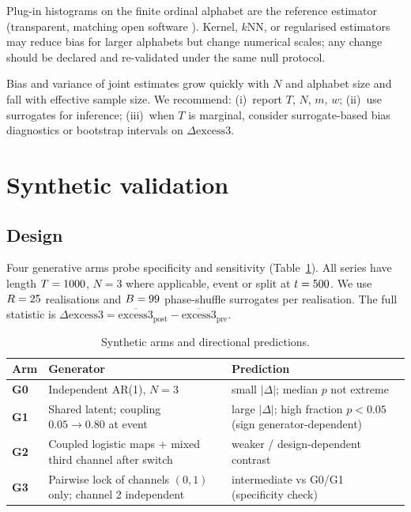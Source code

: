 \documentclass[11pt,a4paper]{article}
\begin{document}
Plug-in histograms on the finite ordinal alphabet are the reference
estimator (transparent, matching open software
\citep{Padilla2026software}). Kernel, $k$NN, or regularised estimators may
reduce bias for larger alphabets but change numerical scales; any change
should be declared and re-validated under the same null protocol.

Bias and variance of joint estimates grow quickly with $N$ and alphabet
size and fall with effective sample size. We recommend: (i)~report $T$,
$N$, $m$, $w$; (ii)~use surrogates for inference; (iii)~when $T$ is
marginal, consider surrogate-based bias diagnostics or bootstrap
intervals on $\Delta\mathrm{excess3}$.

\section{Synthetic validation}
\label{sec:validation}

\subsection{Design}
\label{sec:val_design}

Four generative arms probe specificity and sensitivity
(Table~\ref{tab:arms}). All series have length $T=1000$, $N=3$ where
applicable, event or split at $t=500$. We use $R=25$ realisations
and $B=99$ phase-shuffle surrogates per realisation. The full statistic
is $\Delta\mathrm{excess3}=\overline{\mathrm{excess3}}_{\mathrm{post}}
-\overline{\mathrm{excess3}}_{\mathrm{pre}}$.

\begin{table}[H]
\centering
\caption{Synthetic arms and directional predictions.}
\label{tab:arms}
\begin{tabular}{@{}p{1.2cm}p{5.2cm}p{5.5cm}@{}}
\toprule
Arm & Generator & Prediction \\
\midrule
\textbf{G0} & Independent AR(1), $N=3$ & small $|\Delta|$; median $p$ not extreme \\
\textbf{G1} & Shared latent; coupling $0.05\to 0.80$ at event & large $|\Delta|$; high fraction $p<0.05$ (sign generator-dependent) \\
\textbf{G2} & Coupled logistic maps + mixed third channel after switch & weaker / design-dependent contrast \\
\textbf{G3} & Pairwise lock of channels $(0,1)$ only; channel 2 independent & intermediate vs G0/G1 (specificity check) \\
\bottomrule
\end{tabular}
\end{table}
\end{document}
